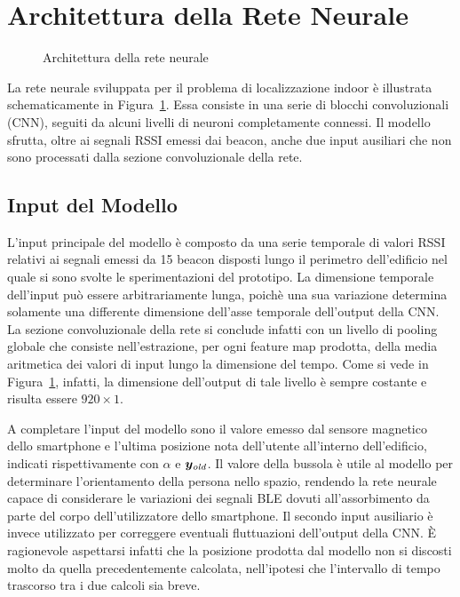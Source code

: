 \section{Architettura della Rete Neurale}
\begin{figure}[htp]
  \caption{Architettura della rete neurale}%
  \label{fig:crynet}%
\end{figure}
La rete neurale sviluppata per il problema di localizzazione indoor è
illustrata schematicamente in Figura~\ref{fig:crynet}. Essa consiste in una
serie di blocchi convoluzionali (CNN), seguiti da alcuni livelli di neuroni
completamente connessi. Il modello sfrutta, oltre ai segnali RSSI emessi dai
beacon, anche due input ausiliari che non sono processati dalla sezione
convoluzionale della rete.
\subsection{Input del Modello}\label{subsec:input}
L'input principale del modello è composto da una serie temporale di valori RSSI
relativi ai segnali emessi da 15 beacon disposti lungo il perimetro
dell'edificio nel quale si sono svolte le sperimentazioni del prototipo. La
dimensione temporale dell'input può essere arbitrariamente lunga, poichè una
sua variazione determina solamente una differente dimensione dell'asse
temporale dell'output della CNN\@. La sezione convoluzionale della rete si
conclude infatti con un livello di pooling globale che consiste
nell'estrazione, per ogni feature map prodotta, della media aritmetica dei
valori di input lungo la dimensione del tempo. Come si vede in
Figura~\ref{fig:crynet}, infatti, la dimensione dell'output di tale livello è
sempre costante e risulta essere $920\times1$.

A completare l'input del modello sono il valore emesso dal sensore magnetico
dello smartphone e l'ultima posizione nota dell'utente all'interno
dell'edificio, indicati rispettivamente con \(\alpha\) e \( \bm y_{\mathit{old}} \). Il
valore della bussola è utile al modello per determinare l'orientamento della
persona nello spazio, rendendo la rete neurale capace di considerare le
variazioni dei segnali BLE dovuti all'assorbimento da parte del corpo
dell'utilizzatore dello smartphone. Il secondo input ausiliario è invece
utilizzato per correggere eventuali fluttuazioni dell'output della CNN.
È ragionevole aspettarsi infatti che la posizione prodotta dal modello non si
discosti molto da quella precedentemente calcolata, nell'ipotesi che
l'intervallo di tempo trascorso tra i due calcoli sia breve.

